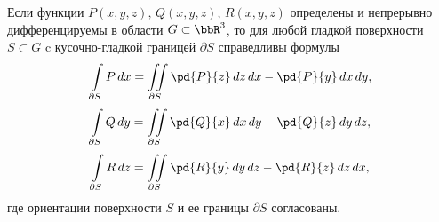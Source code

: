 \begin{thm}
Если функции $P(x,y,z),\, Q(x,y,z),\, R(x,y,z)$ определены и непрерывно дифференцируемы в области $G\subset \bbR^3$, то для любой гладкой поверхности $S\subset G$ c кусочно-гладкой границей $\partial S$ справедливы формулы
\begin{equation} \label{yaa14e2}
\int\limits_{\partial S} P\,dx = \iint\limits_{\partial S} \pd{P}{z}\,dz\,dx-\pd{P}{y}\,dx\,dy,
\end{equation}
\begin{equation} \label{yaa14e3}
\int\limits_{\partial S} Q\,dy = \iint\limits_{\partial S} \pd{Q}{x}\,dx\,dy- \pd{Q}{z}\,dy\,dz,
\end{equation}
\begin{equation} \label{yaa14e4}
\int\limits_{\partial S} R\,dz =\iint\limits_{\partial S} \pd{R}{y}\,dy\,dz- \pd{R}{z}\,dz\,dx,
\end{equation}
где ориентации поверхности $S$ и ее границы $\partial S$ согласованы.
\end{thm}
